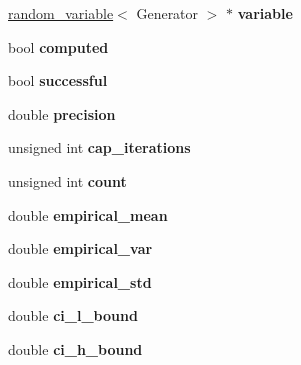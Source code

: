 \begin{DoxyCompactItemize}
\item 
\mbox{\label{classmonte__carlo_ad179708fe615012fcaa71adfb013cf3b}} 
\mbox{\hyperlink{classrandom__variable}{random\+\_\+variable}}$<$ Generator $>$ $\ast$ {\bfseries variable}
\item 
\mbox{\label{classmonte__carlo_a62d218e17216c5cd8db237d2e446f950}} 
bool {\bfseries computed}
\item 
\mbox{\label{classmonte__carlo_a7ef35469245e3f4d91c822ece547aa66}} 
bool {\bfseries successful}
\item 
\mbox{\label{classmonte__carlo_a27a554ebe8e1847fee8291ed93f24423}} 
double {\bfseries precision}
\item 
\mbox{\label{classmonte__carlo_ac0f656225be3c3d9bf7eb0edfa4e95c6}} 
unsigned int {\bfseries cap\+\_\+iterations}
\item 
\mbox{\label{classmonte__carlo_ade5ed60cafd32398a80daf71859a824e}} 
unsigned int {\bfseries count}
\item 
\mbox{\label{classmonte__carlo_aedf0cabb9a89b2b02aa63dc8b00e34d5}} 
double {\bfseries empirical\+\_\+mean}
\item 
\mbox{\label{classmonte__carlo_af698280f1f16c333b108f06e41b45c7e}} 
double {\bfseries empirical\+\_\+var}
\item 
\mbox{\label{classmonte__carlo_a22d78794a12eabe859d6249b7206aa6a}} 
double {\bfseries empirical\+\_\+std}
\item 
\mbox{\label{classmonte__carlo_ad02f29a48b9977ff00ec9044bfde2f03}} 
double {\bfseries ci\+\_\+l\+\_\+bound}
\item 
\mbox{\label{classmonte__carlo_a2c0e5849e8a88c643706159019b24476}} 
double {\bfseries ci\+\_\+h\+\_\+bound}
\end{DoxyCompactItemize}


